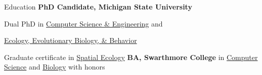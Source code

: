 \begin{rubric}{Education}
\entry*[2013 -- Present]%
	\textbf{PhD Candidate, Michigan State University}
    \par Dual PhD in \underline{Computer Science \& Engineering} and 
    \par \hspace{.8in} \underline{Ecology, Evolutionary Biology, \& Behavior}
    \par
	Graduate certificate in \underline{Spatial Ecology}
%
\entry*[2009 -- 2013]%
	\textbf{BA, Swarthmore College} in \underline{Computer Science} and \underline{Biology} with honors
%
\end{rubric}